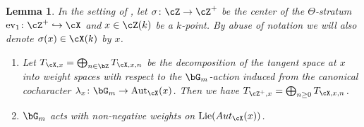 \documentclass[a4paper]{amsart}
\numberwithin{equation}{section}
\theoremstyle{plain}
\newtheorem{lem}[thm]{Lemma}
\theoremstyle{definition}
\DeclareMathOperator{\ev}{ev}
\DeclareMathOperator{\Aut}{Aut}
\newcommand{\hookarr}{\hookrightarrow}
\newcommand{\co}{\colon}
\DeclareMathOperator{\Lie}{Lie}
\begin{document}
\begin{lem}\label{L:stratum_weights}
	In the setting of , let $\sigma \co \cZ \to \cZ^+$ be the center of the $\Theta$-stratum $
\ev_1 \co \cZ^+ \hookarr \cX$ and $x \in \cZ(k)$ be a $k$-point. By abuse of notation we will also denote $\sigma(x) \in \cX(k)$ by $x$.
	\begin{enumerate}
		\item Let $T_{\cX,x}=\bigoplus_{n\in \bZ} T_{\cX,x,n}$ be the decomposition of the tangent space at $x$ into weight spaces with respect to the $\bG_m$-action induced from the canonical cocharacter $\lambda_x\co \bG_m \to \Aut_{\cX}(x)$. Then we have $T_{\cZ^+,x}=\bigoplus_{n\geq 0}T_{\cX,x,n}$.
		\item $\bG_m$ acts with non-negative weights on $\Lie(Aut_{\cX}(x))$.
	\end{enumerate}
\end{lem}
\end{document}
